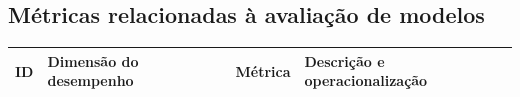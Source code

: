 \subsection{Métricas relacionadas à avaliação de modelos}\label{muxe9tricas-relacionadas-uxe0-questuxe3o-de-pesquisa}\label{subsec:metricas-avaliacao}

{\def\LTcaptype{none} %
	\begin{longtable}[]{|>{\raggedright\arraybackslash}p{}|>{\raggedright\arraybackslash}p{}|>{\raggedright\arraybackslash}p{}|>{\raggedright\arraybackslash}p{}|}
		\hline
		\begin{minipage}[b]{\linewidth}\raggedright
			ID
		\end{minipage} & \begin{minipage}[b]{\linewidth}\raggedright
			                 Dimensão do desempenho
		                 \end{minipage}                           & \begin{minipage}[b]{\linewidth}\raggedright
			                                                            Métrica
		                                                            \end{minipage}         & \begin{minipage}[b]{\linewidth}\raggedright
			                                                                                     Descrição e operacionalização
		                                                                                     \end{minipage}                                                                            \\ \hline
		\endhead
		

\end{longtable}}
